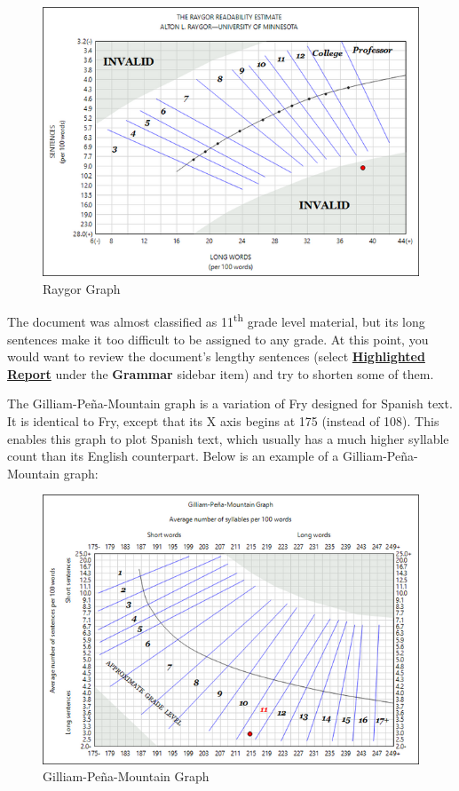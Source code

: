 \documentclass[
]{book}
\theoremstyle{definition}
\theoremstyle{definition}
\theoremstyle{definition}
\theoremstyle{definition}
\theoremstyle{remark}
\begin{document}
\begin{figure}[H]

{\centering \includegraphics[width=0.75\linewidth,]{Images/raygorbadgrade} 

}

\caption{Raygor Graph}\label{fig:raygorBadGrade}
\end{figure}

The document was almost classified as 11\textsuperscript{th} grade level material, but its long sentences make it too difficult to be assigned to any grade. At this point, you would want to review the document's lengthy sentences (select \protect\hyperlink{reviewing-standard-grammar}{\textbf{Highlighted Report}} under the \textbf{Grammar} sidebar item) and try to shorten some of them.

The Gilliam-Peña-Mountain graph is a variation of Fry designed for Spanish text. It is identical to Fry, except that its X axis begins at 175 (instead of 108). This enables this graph to plot Spanish text, which usually has a much higher syllable count than its English counterpart. Below is an example of a Gilliam-Peña-Mountain graph:

\begin{figure}[H]

{\centering \includegraphics[width=0.75\linewidth,]{Images/GpmFry} 

}

\caption{Gilliam-Peña-Mountain Graph}\label{fig:gpm2}
\end{figure}
\end{document}
